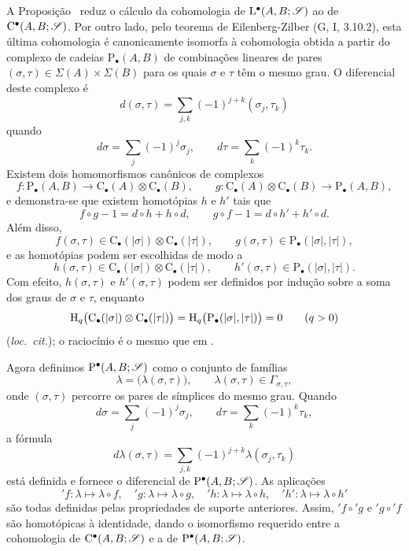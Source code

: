 \begin{env}[11.8.6]
\label{0.11.8.6}
A Proposição~ reduz o cálculo da cohomologia de
$\mathrm{L}^\bullet(A,B;\mathscr{S})$ ao de
$\mathrm{C}^\bullet(A,B;\mathscr{S})$.
Por outro lado, pelo teorema de Eilenberg-Zilber
(G, I, 3.10.2), esta última cohomologia é canonicamente isomorfa à
cohomologia obtida a partir do complexo de cadeias
$\mathrm{P}_\bullet(A,B)$ de combinações lineares de pares
$(\sigma,\tau)\in\Sigma(A)\times\Sigma(B)$ para os quais $\sigma$ e
$\tau$ têm o mesmo grau.
O diferencial deste complexo é
\[
  d(\sigma,\tau)
  =
  \sum_{j,k}(-1)^{j+k}(\sigma_j,\tau_k)
\]
quando
\[
  d\sigma=\sum_j(-1)^j\sigma_j,
  \qquad
  d\tau=\sum_k(-1)^k\tau_k.
\]
Existem dois homomorfismos canônicos de complexos
\[
  f:\mathrm{P}_\bullet(A,B)
  \longrightarrow
  \mathrm{C}_\bullet(A)\otimes\mathrm{C}_\bullet(B),
  \qquad
  g:\mathrm{C}_\bullet(A)\otimes\mathrm{C}_\bullet(B)
  \longrightarrow
  \mathrm{P}_\bullet(A,B),
\]
e demonstra-se que existem homotópias $h$ e $h'$ tais que
\[
  f\circ g-1=d\circ h+h\circ d,
  \qquad
  g\circ f-1=d\circ h'+h'\circ d.
\]
Além disso,
\[
  f(\sigma,\tau)
  \in
  \mathrm{C}_\bullet(|\sigma|)
  \otimes
  \mathrm{C}_\bullet(|\tau|),
  \qquad
  g(\sigma,\tau)
  \in
  \mathrm{P}_\bullet(|\sigma|,|\tau|),
\]
e as homotópias podem ser escolhidas de modo a
\[
  h(\sigma,\tau)
  \in
  \mathrm{C}_\bullet(|\sigma|)
  \otimes
  \mathrm{C}_\bullet(|\tau|),
  \qquad
  h'(\sigma,\tau)
  \in
  \mathrm{P}_\bullet(|\sigma|,|\tau|).
\]
Com efeito, $h(\sigma,\tau)$ e $h'(\sigma,\tau)$ podem ser definidos por
indução sobre a soma dos graus de $\sigma$ e $\tau$, enquanto
\[
  \mathrm{H}_q\bigl(
    \mathrm{C}_\bullet(|\sigma|)
    \otimes
    \mathrm{C}_\bullet(|\tau|)
  \bigr)
  =
  \mathrm{H}_q\bigl(\mathrm{P}_\bullet(|\sigma|,|\tau|)\bigr)
  =
  0
  \qquad(q>0)
\]
(\emph{loc.\ cit.}); o raciocínio é o mesmo que em
.

Agora definimos $\mathrm{P}^\bullet(A,B;\mathscr{S})$ como o conjunto de famílias
\[
  \lambda=\bigl(\lambda(\sigma,\tau)\bigr),
  \qquad
  \lambda(\sigma,\tau)\in\Gamma_{\sigma,\tau},
\]
onde $(\sigma,\tau)$ percorre os pares de símplices do mesmo grau.
Quando
\[
  d\sigma=\sum_j(-1)^j\sigma_j,
  \qquad
  d\tau=\sum_k(-1)^k\tau_k,
\]
a fórmula
\[
  d\lambda(\sigma,\tau)
  =
  \sum_{j,k}(-1)^{j+k}\lambda(\sigma_j,\tau_k)
\]
está definida e fornece o diferencial de
$\mathrm{P}^\bullet(A,B;\mathscr{S})$.
As aplicações
\[
  {}'\!f:\lambda\longmapsto\lambda\circ f,\quad
  {}'\!g:\lambda\longmapsto\lambda\circ g,\quad
  {}'\!h:\lambda\longmapsto\lambda\circ h,\quad
  {}'\!h':\lambda\longmapsto\lambda\circ h'
\]
são todas definidas pelas propriedades de suporte anteriores.
Assim, ${}'\!f\circ{}'\!g$ e ${}'\!g\circ{}'\!f$ são homotópicas à
identidade, dando o isomorfismo requerido entre a cohomologia de
$\mathrm{C}^\bullet(A,B;\mathscr{S})$ e a de
$\mathrm{P}^\bullet(A,B;\mathscr{S})$.
\end{env}

